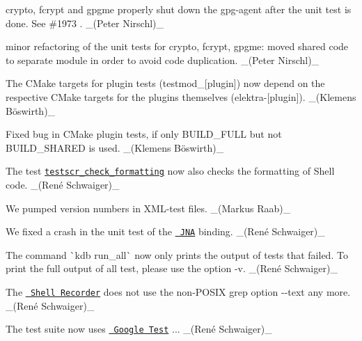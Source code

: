 \begin{DoxyItemize}
\item crypto, fcrypt and gpgme properly shut down the gpg-\/agent after the unit test is done. See \#1973 . \+\_\+(\+Peter Nirschl)\+\_\+
\item minor refactoring of the unit tests for crypto, fcrypt, gpgme\+: moved shared code to separate module in order to avoid code duplication. \+\_\+(\+Peter Nirschl)\+\_\+
\item The C\+Make targets for plugin tests ({\ttfamily testmod\+\_\+\mbox{[}plugin\mbox{]}}) now depend on the respective C\+Make targets for the plugins themselves ({\ttfamily elektra-\/\mbox{[}plugin\mbox{]}}). \+\_\+(Klemens Böswirth)\+\_\+
\item Fixed bug in C\+Make plugin tests, if only {\ttfamily B\+U\+I\+L\+D\+\_\+\+F\+U\+LL} but not {\ttfamily B\+U\+I\+L\+D\+\_\+\+S\+H\+A\+R\+ED} is used. \+\_\+(Klemens Böswirth)\+\_\+
\item The test \href{https://master.libelektra.org/tests/shell/check_formatting.sh}{\texttt{ {\ttfamily testscr\+\_\+check\+\_\+formatting}}} now also checks the formatting of Shell code. \+\_\+(René Schwaiger)\+\_\+
\item We pumped version numbers in X\+M\+L-\/test files. \+\_\+(\+Markus Raab)\+\_\+
\item We fixed a crash in the unit test of the \href{https://www.libelektra.org/bindings/jna}{\texttt{ J\+NA}} binding. \+\_\+(René Schwaiger)\+\_\+
\item The command \`{}kdb run\+\_\+all\`{} now only prints the output of tests that failed. To print the full output of all test, please use the option {\ttfamily -\/v}. \+\_\+(René Schwaiger)\+\_\+
\item The \href{https://master.libelektra.org/tests/shell/shell_recorder}{\texttt{ Shell Recorder}} does not use the non-\/\+P\+O\+S\+IX grep option {\ttfamily -\/-\/text} any more. \+\_\+(René Schwaiger)\+\_\+
\item The test suite now uses \href{https://github.com/google/googletest}{\texttt{ Google Test}} {..}. \+\_\+(René Schwaiger)\+\_\+
\end{DoxyItemize}


